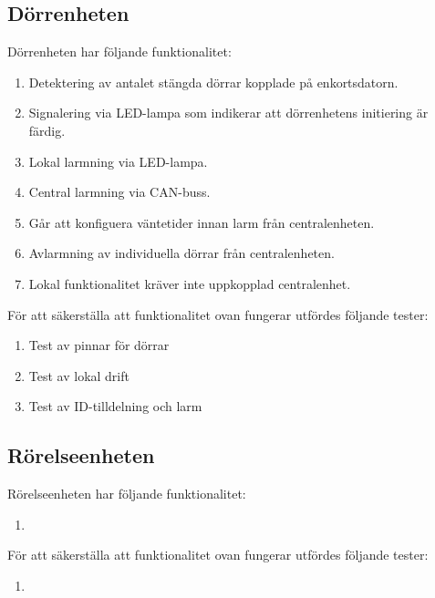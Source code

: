 \documentclass{article}
\begin{document}
 
 \subsection{Dörrenheten}
 Dörrenheten har följande funktionalitet:
 \begin{enumerate}
     \item Detektering av antalet stängda dörrar kopplade på enkortsdatorn.
     \item Signalering via LED-lampa som indikerar att dörrenhetens initiering är färdig.
     \item Lokal larmning via LED-lampa.
     \item Central larmning via CAN-buss.
     \item Går att konfiguera väntetider innan larm från centralenheten.
     \item Avlarmning av individuella dörrar från centralenheten.
     \item Lokal funktionalitet kräver inte uppkopplad centralenhet.
     
 \end{enumerate}
 För att säkerställa att funktionalitet ovan fungerar utfördes följande tester:
 \begin{enumerate}
     \item Test av pinnar för dörrar
     \item Test av lokal drift
     \item Test av ID-tilldelning och larm
 \end{enumerate}
 
 \subsection{Rörelseenheten}
 Rörelseenheten har följande funktionalitet:
 \begin{enumerate}
     \item
 \end{enumerate}
 För att säkerställa att funktionalitet ovan fungerar utfördes följande tester:
 \begin{enumerate}
     \item 
 \end{enumerate}
\end{document}
